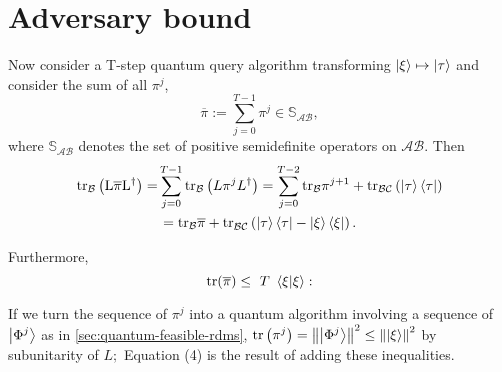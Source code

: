 \documentclass{article}
\begin{document}
\section{Adversary bound}

Now consider a T-step quantum query algorithm transforming $\displaystyle \ket{\xi } \mapsto \ket{\tau }$ and consider the sum of all $\displaystyle \pi ^{j}$,
\begin{equation}
\overline{\pi } :=\sum _{j=0}^{T-1} \pi ^{j} \in \mathbb{S}\mathcal{_{\mathcal{AB}}} ,
\end{equation}
where $\displaystyle \mathbb{S}_{\mathcal{AB}}$ denotes the set of positive semidefinite operators on $\displaystyle \mathcal{AB} .$ Then\begin{gather}
\mathrm{tr_{\mathcal{B}}\left( L\overline{\pi } L^{\dagger }\right) =}\sum _{j=0}^{T-1}\mathrm{tr}_{\mathcal{B}}\left( L\pi ^{j} L^{\dagger }\right) =\sum _{j=0}^{T-2}\mathrm{tr}_{\mathcal{B}} \pi ^{j+1} +\mathrm{tr}_{\mathcal{BC}}\left(\ket{\tau }\bra{\tau }\right)\\
=\mathrm{tr_{\mathcal{B}}\overline{\pi } +tr}_{\mathcal{BC}}\left(\ket{\tau }\bra{\tau } -\ket{\xi }\bra{\xi }\right) . \notag
\end{gather}

Furthermore,\begin{equation}
\mathrm{tr}(\overline{\pi }) \leq \ T\ \bra{\xi }\ket{\xi}:
\end{equation}

If we turn the sequence of $\displaystyle \pi ^{j}$ into a quantum algorithm involving a sequence of $\displaystyle \ket{\Phi ^{j}}$ as in \ref{sec:quantum-feasible-rdms}, $\displaystyle \mathrm{tr}\left( \pi ^{j}\right) =\left\Vert \ket{\Phi ^{j}}\right\Vert ^{2} \leq \left\Vert \ket{\xi }\right\Vert ^{2}$ by subunitarity of $\displaystyle L;$ Equation (4) is the result of adding these inequalities.
\end{document}
